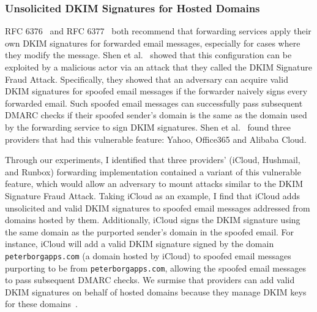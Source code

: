 \subsubsection{Unsolicited DKIM Signatures for Hosted Domains}
\label{subsubsec:unsolicited_dkim}
RFC 6376~\cite{rfc6376} and RFC 6377~\cite{rfc6377} both recommend that
forwarding services apply their own DKIM signatures for forwarded email
messages, especially for cases where they modify the message. 
Shen et al.~\cite{shen2020weak} showed that this configuration can be exploited
by a malicious actor via an attack that they called the DKIM Signature Fraud
Attack.  Specifically, they showed that an adversary can acquire valid DKIM
signatures for spoofed email messages if the forwarder naively signs every
forwarded email. Such spoofed email messages can successfully pass subsequent
DMARC checks if their spoofed sender's domain is the same as the domain used by
the forwarding service to sign DKIM signatures. Shen et al.~\cite{shen2020weak}
found three providers that had this vulnerable feature: Yahoo, Office365 and
Alibaba Cloud.

Through our experiments, I identified that three providers' (iCloud, Hushmail, and Runbox) forwarding implementation contained a variant of this vulnerable feature, which would allow an adversary to mount attacks similar to the DKIM Signature Fraud Attack.
Taking iCloud as an example, I find that iCloud adds unsolicited and valid DKIM signatures to spoofed email messages addressed from domains hosted by them. Additionally,
iCloud signs the DKIM signature using the same domain as the purported sender's domain in the spoofed email. For instance, iCloud will add a valid DKIM signature signed by the domain \texttt{peterborgapps.com} (a domain hosted by iCloud) to spoofed email messages purporting to be from \texttt{peterborgapps.com}, allowing the spoofed email messages to pass subsequent DMARC checks.
We surmise that providers can add valid DKIM signatures on behalf of hosted domains because they manage DKIM keys for these domains~\cite{Setupane66:online, HushDKIM}.





